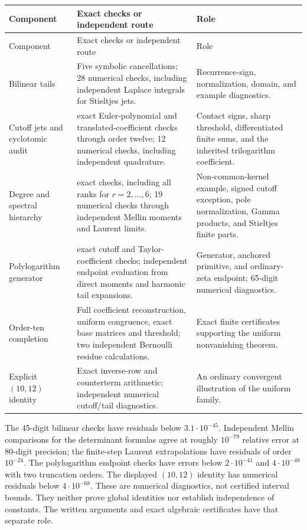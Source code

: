 \begingroup\small
\begin{longtable}{@{}>{\raggedright\arraybackslash}p{}>{\raggedright\arraybackslash}p{}>{\raggedright\arraybackslash}p{}@{}}
\toprule
Component & Exact checks or independent route & Role \\
\midrule\endfirsthead
\toprule Component & Exact checks or independent route & Role \\
\midrule\endhead
Bilinear tails & Five symbolic cancellations; 28 numerical checks,
including independent Laplace integrals for Stieltjes jets. &
Recurrence-sign, normalization, domain, and example diagnostics. \\
\addlinespace
Cutoff jets and cyclotomic audit & 74 exact Euler-polynomial and
translated-coefficient checks through order twelve; 12 numerical
checks, including independent quadrature. & Contact signs, sharp
threshold, differentiated finite sums, and the inherited trilogarithm
coefficient. \\
\addlinespace
Degree and spectral hierarchy & 45 exact checks, including all
ranks for $r=2,\ldots,6$; 19 numerical checks through independent
Mellin moments and Laurent limits. & Non-common-kernel example,
signed cutoff exception, pole normalization, Gamma products, and
Stieltjes finite parts. \\
\addlinespace
Polylogarithm generator & 122 exact cutoff and Taylor-coefficient
checks; independent endpoint evaluation from direct moments and
harmonic tail expansions. & Generator, anchored primitive, and
ordinary-zeta endpoint; 65-digit numerical diagnostics. \\
\addlinespace
Order-ten completion & Full coefficient reconstruction, uniform
congruence, exact base matrices and threshold; two independent
Bernoulli residue calculations. & Exact finite certificates supporting
the uniform nonvanishing theorem. \\
\addlinespace
Explicit $(10,12)$ identity & Exact inverse-row and counterterm
arithmetic; independent numerical cutoff/tail diagnostics. & An
ordinary convergent illustration of the uniform family. \\
\bottomrule
\end{longtable}
\endgroup

The 45-digit bilinear checks have residuals below $3.1\cdot10^{-45}$.
Independent Mellin comparisons for the determinant formulas agree
at roughly $10^{-79}$ relative error at 80-digit precision;
the finite-step Laurent extrapolations have residuals of order
$10^{-24}$. The polylogarithm endpoint checks have errors below
$2\cdot10^{-41}$ and $4\cdot10^{-48}$ with two truncation orders.
The displayed $(10,12)$ identity has numerical residuals
below $4\cdot10^{-68}$. These are numerical diagnostics, not certified
interval bounds. They neither prove global identities nor establish
independence of constants. The written arguments and exact algebraic
certificates have that separate role.

